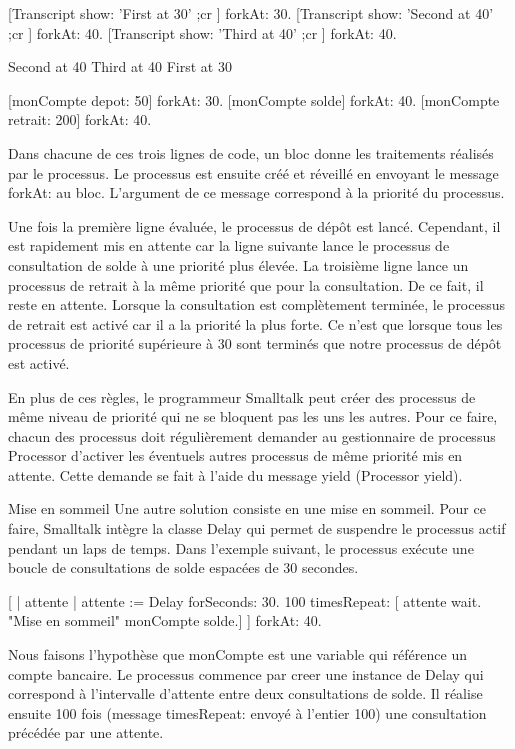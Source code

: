 \documentclass[a4paper,10pt,twoside]{book}
\begin{document}
\begin{code}{}
[Transcript show: 'First at 30' ;cr ] forkAt: 30.
[Transcript show: 'Second at 40' ;cr ] forkAt: 40.
[Transcript show: 'Third at 40' ;cr ] forkAt: 40.
\end{code}

\begin{code}{}
Second at 40
Third at 40
First at 30
\end{code}

[monCompte depot: 50] forkAt: 30.
[monCompte solde] forkAt: 40.
[monCompte retrait: 200] forkAt: 40.


Dans chacune de ces trois lignes de code, un bloc donne les traitements réalisés par le processus. Le processus est ensuite créé et réveillé en envoyant le message forkAt: au bloc. L'argument de ce message correspond à la
priorité du processus.

Une fois la première ligne évaluée, le processus de dépôt est lancé. Cependant, il est rapidement mis en attente car la ligne suivante lance le processus de consultation de solde à une priorité plus élevée. La troisième ligne lance un processus de retrait à la même priorité que pour la consultation. De ce fait, il reste en attente. Lorsque la
consultation est complètement terminée, le processus de retrait est activé car il a la priorité la plus forte. Ce n'est que lorsque tous les processus de priorité supérieure à 30 sont terminés que notre processus de dépôt est activé.

En plus de ces règles, le programmeur Smalltalk peut créer des processus de même niveau de priorité qui ne se bloquent pas les uns les autres. Pour ce faire, chacun des processus doit régulièrement demander au gestionnaire de processus Processor d'activer les éventuels autres processus de même priorité mis en attente.
Cette demande se fait à l'aide du message yield (Processor yield).

Mise en sommeil
Une autre solution consiste en une mise en sommeil. Pour ce faire, Smalltalk intègre la classe Delay qui permet de suspendre le processus actif pendant un laps de temps. Dans l'exemple suivant, le processus exécute une boucle de consultations de solde espacées de 30 secondes.

[ | attente |
    attente := Delay forSeconds: 30.
    100 timesRepeat: [
             attente wait.  "Mise en sommeil"
             monCompte solde.]
] forkAt: 40.


Nous faisons l'hypothèse que monCompte est une variable qui référence un compte bancaire. Le processus commence par creer une instance de Delay qui correspond à l'intervalle d'attente entre deux consultations de solde. Il réalise ensuite 100 fois (message timesRepeat: envoyé à l'entier 100) une consultation précédée par une attente.
\end{document}

